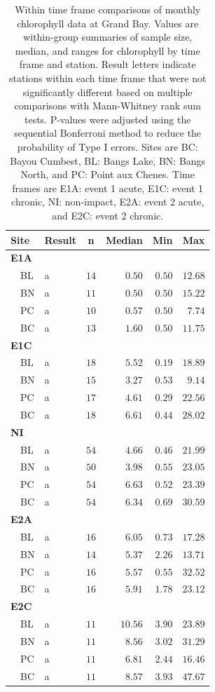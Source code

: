 \documentclass[letterpaper,12pt]{article}\usepackage[]{graphicx}\usepackage[]{color}
\begin{document}
\clearpage

\begin{table}[!tbp]
\caption{Within time frame comparisons of monthly chlorophyll data at Grand Bay.  Values are within-group summaries of sample size, median, and ranges for chlorophyll by time frame and station.  Result letters indicate stations within each time frame that were not significantly different based on multiple comparisons with Mann-Whitney rank sum tests.  P-values were adjusted using the sequential Bonferroni method to reduce the probability of Type I errors. Sites are BC: Bayou Cumbest, BL: Bangs Lake, BN: Bangs North, and PC: Point aux Chenes.  Time frames are E1A: event 1 acute, E1C: event 1 chronic, NI: non-impact, E2A: event 2 acute, and E2C: event 2 chronic.\label{tab:chltab2}} 
\begin{center}
\begin{tabular}{llrrrr}
\hline\hline
\multicolumn{1}{l}{Site}&\multicolumn{1}{c}{Result}&\multicolumn{1}{c}{n}&\multicolumn{1}{c}{Median}&\multicolumn{1}{c}{Min}&\multicolumn{1}{c}{Max}\tabularnewline
\hline
{\bfseries E1A}&&&&&\tabularnewline
~~BL&a&$14$&$ 0.50$&$0.50$&$12.68$\tabularnewline
~~BN&a&$11$&$ 0.50$&$0.50$&$15.22$\tabularnewline
~~PC&a&$10$&$ 0.57$&$0.50$&$ 7.74$\tabularnewline
~~BC&a&$13$&$ 1.60$&$0.50$&$11.75$\tabularnewline
\hline
{\bfseries E1C}&&&&&\tabularnewline
~~BL&a&$18$&$ 5.52$&$0.19$&$18.89$\tabularnewline
~~BN&a&$15$&$ 3.27$&$0.53$&$ 9.14$\tabularnewline
~~PC&a&$17$&$ 4.61$&$0.29$&$22.56$\tabularnewline
~~BC&a&$18$&$ 6.61$&$0.44$&$28.02$\tabularnewline
\hline
{\bfseries NI}&&&&&\tabularnewline
~~BL&a&$54$&$ 4.66$&$0.46$&$21.99$\tabularnewline
~~BN&a&$50$&$ 3.98$&$0.55$&$23.05$\tabularnewline
~~PC&a&$54$&$ 6.63$&$0.52$&$23.39$\tabularnewline
~~BC&a&$54$&$ 6.34$&$0.69$&$30.59$\tabularnewline
\hline
{\bfseries E2A}&&&&&\tabularnewline
~~BL&a&$16$&$ 6.05$&$0.73$&$17.28$\tabularnewline
~~BN&a&$14$&$ 5.37$&$2.26$&$13.71$\tabularnewline
~~PC&a&$16$&$ 5.57$&$0.55$&$32.52$\tabularnewline
~~BC&a&$16$&$ 5.91$&$1.78$&$23.12$\tabularnewline
\hline
{\bfseries E2C}&&&&&\tabularnewline
~~BL&a&$11$&$10.56$&$3.90$&$23.89$\tabularnewline
~~BN&a&$11$&$ 8.56$&$3.02$&$31.29$\tabularnewline
~~PC&a&$11$&$ 6.81$&$2.44$&$16.46$\tabularnewline
~~BC&a&$11$&$ 8.57$&$3.93$&$47.67$\tabularnewline
\hline
\end{tabular}\end{center}

\end{table}

\clearpage
\end{document}
